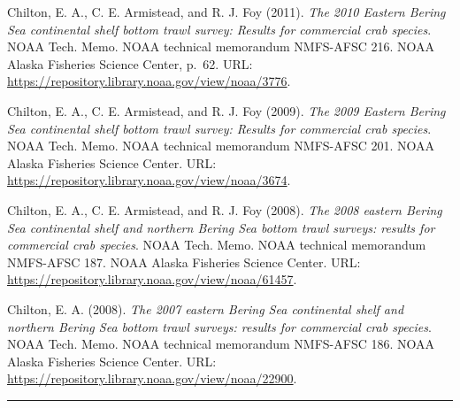 \documentclass[
  letterpaper,
  oneside,
  open=any]{scrbook}
\begin{document}
Chilton, E. A., C. E. Armistead, and R. J. Foy (2011). \emph{The 2010
Eastern Bering Sea continental shelf bottom trawl survey: Results for
commercial crab species}. NOAA Tech. Memo. NOAA technical memorandum
NMFS-AFSC 216. NOAA Alaska Fisheries Science Center, p.~62. URL:
\url{https://repository.library.noaa.gov/view/noaa/3776}.

Chilton, E. A., C. E. Armistead, and R. J. Foy (2009). \emph{The 2009
Eastern Bering Sea continental shelf bottom trawl survey: Results for
commercial crab species}. NOAA Tech. Memo. NOAA technical memorandum
NMFS-AFSC 201. NOAA Alaska Fisheries Science Center. URL:
\url{https://repository.library.noaa.gov/view/noaa/3674}.

Chilton, E. A., C. E. Armistead, and R. J. Foy (2008). \emph{The 2008
eastern Bering Sea continental shelf and northern Bering Sea bottom
trawl surveys: results for commercial crab species}. NOAA Tech. Memo.
NOAA technical memorandum NMFS-AFSC 187. NOAA Alaska Fisheries Science
Center. URL: \url{https://repository.library.noaa.gov/view/noaa/61457}.

Chilton, E. A. (2008). \emph{The 2007 eastern Bering Sea continental
shelf and northern Bering Sea bottom trawl surveys: results for
commercial crab species}. NOAA Tech. Memo. NOAA technical memorandum
NMFS-AFSC 186. NOAA Alaska Fisheries Science Center. URL:
\url{https://repository.library.noaa.gov/view/noaa/22900}.

\begin{center}\rule{0.5\linewidth}{0.5pt}\end{center}


\backmatter
\end{document}
